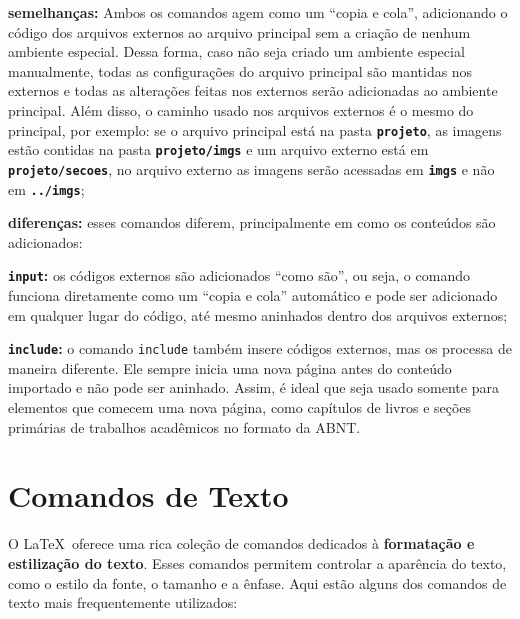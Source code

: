 \begin{alineas}
	\item \textbf{semelhanças:} Ambos os comandos agem como um ``copia e cola'', adicionando o código dos arquivos externos ao arquivo principal sem a criação de nenhum ambiente especial. Dessa forma, caso não seja criado um ambiente especial manualmente, todas as configurações do arquivo principal são mantidas nos externos e todas as alterações feitas nos externos serão adicionadas ao ambiente principal. Além disso, o caminho usado nos arquivos externos é o mesmo do principal, por exemplo: se o arquivo principal está na pasta \textbf{\texttt{projeto}}, as imagens estão contidas na pasta \textbf{\texttt{projeto/imgs}} e um arquivo externo está em \textbf{\texttt{projeto/secoes}}, no arquivo externo as imagens serão acessadas em \textbf{\texttt{imgs}} e não em \textbf{\texttt{../imgs}};
	
	\item \textbf{diferenças:} esses comandos diferem, principalmente em como os conteúdos são adicionados:
	\begin{alineas}
		\item \textbf{\texttt{input}:} os códigos externos são adicionados ``como são'', ou seja, o comando funciona diretamente como um ``copia e cola'' automático e pode ser adicionado em qualquer lugar do código, até mesmo aninhados dentro dos arquivos externos;
		
		\item \textbf{\texttt{include}:} o comando \texttt{include} também insere códigos externos, mas os processa de maneira diferente. Ele sempre inicia uma nova página antes do conteúdo importado e não pode ser aninhado. Assim, é ideal que seja usado somente para elementos que comecem uma nova página, como capítulos de livros e seções primárias de trabalhos acadêmicos no formato da ABNT.
	\end{alineas}
\end{alineas}

\section{Comandos de Texto}

O \LaTeX\ oferece uma rica coleção de comandos dedicados à \textbf{formatação e estilização do texto}. Esses comandos permitem controlar a aparência do texto, como o estilo da fonte, o tamanho e a ênfase.
Aqui estão alguns dos comandos de texto mais frequentemente utilizados:

